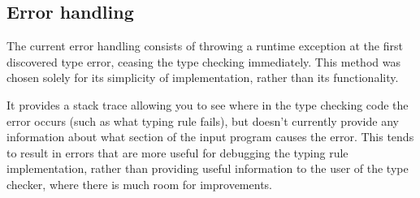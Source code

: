\documentclass[nofilelist]{cslthse-msc}
\begin{document}
\subsection{Error handling}\label{errorhandling}
The current error handling consists of throwing a runtime exception at the first discovered type error, ceasing the type checking immediately.
This method was chosen solely for its simplicity of implementation, rather than its functionality.

It provides a stack trace allowing you to see where in the type checking code the error occurs (such as what typing rule fails), but doesn't currently provide any information about what section of the input program causes the error.
This tends to result in errors that are more useful for debugging the typing rule implementation, rather than providing useful information to the user of the type checker, where there is much room for improvements.

%
%
%
\end{document}
